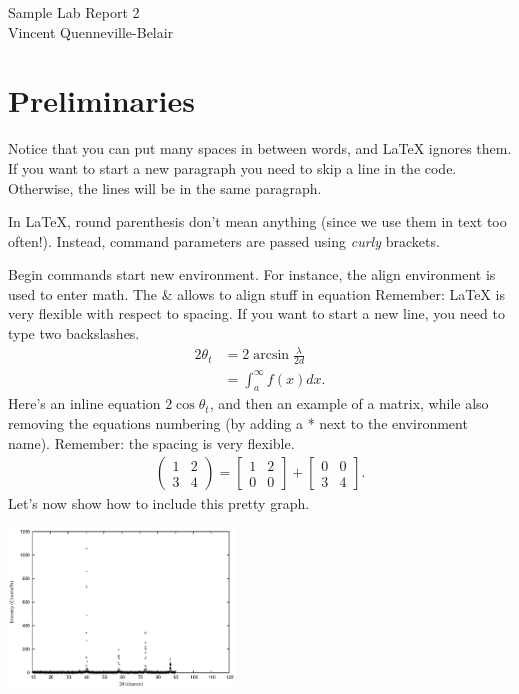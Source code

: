 \documentclass{article}
\begin{document}

\begin{center}
\large Sample Lab Report 2\\
\large Vincent Quenneville-Belair
\end{center}

\section*{Preliminaries}

Notice that you can put many     spaces                  in between words, and LaTeX ignores them. 
If you want to start a new paragraph you need to skip a line in the code.
Otherwise, the lines will be in the same paragraph.

In LaTeX, round parenthesis don't mean anything (since we use them in text too often!). Instead, command parameters are passed using \emph{curly} brackets. 

Begin commands start new environment. For instance, the align environment is used to enter math.
The \& allows to align stuff in equation
Remember: LaTeX is very flexible with respect to spacing. If you want to start a new line, you need to type two backslashes.
\begin{align}
2\theta_t 
&= 2\arcsin{\frac{\lambda}{2d}} \\
&= \int_a^{\infty}f(x)dx.
\end{align}
Here's an inline equation $2\cos\theta_t$, and then an example of a matrix, while also removing the equations numbering (by adding a * next to the environment name).
Remember: the spacing is very flexible.
\begin{align*} 
	\begin{pmatrix} 
		1 & 2 \\ 
		3 & 4 
	\end{pmatrix}
= \begin{bmatrix} 1 & 2 \\ 0 & 0 \end{bmatrix} + \begin{bmatrix} 0 & 0 \\ 3 & 4 \end{bmatrix}.
\end{align*}
Let's now show how to include this pretty graph.
\begin{center}
\includegraphics[width=6cm]{example.eps} 
\end{center}
\end{document}
